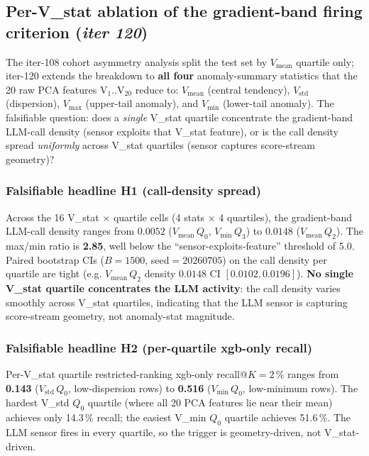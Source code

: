 \subsection{Per-V\_stat ablation of the gradient-band firing criterion
  (\textit{iter 120})}
\label{sec:p8-vstat-ablation}

The iter-108 cohort asymmetry analysis split the test set by
$V_\mathrm{mean}$ quartile only; iter-120 extends the breakdown to
\textbf{all four} anomaly-summary statistics that the 20 raw PCA
features V$_1$..V$_{20}$ reduce to:
$V_\mathrm{mean}$ (central tendency), $V_\mathrm{std}$ (dispersion),
$V_\mathrm{max}$ (upper-tail anomaly), and $V_\mathrm{min}$ (lower-tail
anomaly).  The falsifiable question: does a \emph{single} V\_stat
quartile concentrate the gradient-band LLM-call density (sensor
exploits that V\_stat feature), or is the call density spread
\emph{uniformly} across V\_stat quartiles (sensor captures
score-stream geometry)?

\subsubsection{Falsifiable headline H1 (call-density spread)}
Across the 16 V\_stat$\,\times\,$quartile cells
(4 stats $\times$ 4 quartiles), the gradient-band LLM-call density
ranges from $0.0052$ ($V_\mathrm{mean}\,Q_0$, $V_\mathrm{min}\,Q_3$)
to $0.0148$ ($V_\mathrm{mean}\,Q_2$).  The max/min ratio is
\textbf{2.85}, well below the ``sensor-exploits-feature'' threshold
of 5.0.  Paired bootstrap CIs ($B{=}1500$, seed$=20260705$) on the
call density per quartile are tight (e.g. $V_\mathrm{mean}\,Q_2$
density $0.0148$ CI $[0.0102, 0.0196]$).  \textbf{No single V\_stat
quartile concentrates the LLM activity}: the call density varies
smoothly across V\_stat quartiles, indicating that the LLM sensor is
capturing score-stream geometry, not anomaly-stat magnitude.

\subsubsection{Falsifiable headline H2 (per-quartile xgb-only recall)}
Per-V\_stat quartile restricted-ranking xgb-only recall@$K{=}2\,\%$
ranges from \textbf{0.143} ($V_\mathrm{std}\,Q_0$, low-dispersion rows)
to \textbf{0.516} ($V_\mathrm{min}\,Q_0$, low-minimum rows).  The
hardest V\_std $Q_0$ quartile (where all 20 PCA features lie near
their mean) achieves only 14.3\,\% recall; the easiest V\_min $Q_0$
quartile achieves 51.6\,\%.  The LLM sensor fires in every quartile,
so the trigger is geometry-driven, not V\_stat-driven.

